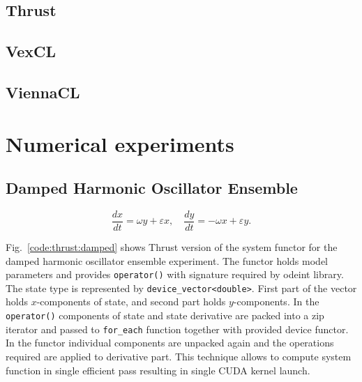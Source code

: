 \documentclass[1p]{elsarticle}
\newcommand{\code}[1]{\lstinline|#1|}
\newcommand{\figref}[1]{Fig.~\ref{#1}}
\begin{document}
\subsection{Thrust}
\subsection{VexCL}
\subsection{ViennaCL}

\section{Numerical experiments}

\subsection{Damped Harmonic Oscillator Ensemble}

\begin{equation} \label{eq:dampedsystem}
    \frac{dx}{dt} = \omega y + \varepsilon x, \quad 
    \frac{dy}{dt} = -\omega x + \varepsilon y.
\end{equation}

\figref{code:thrust:damped} shows Thrust version of the system functor for the
damped harmonic oscillator ensemble experiment. The functor holds model
parameters and provides \code{operator()} with signature required by odeint
library. The state type is represented by \code{device_vector<double>}.  First
part of the vector holds $x$-components of state, and second part holds
$y$-components. In the \code{operator()} components of state and state
derivative are packed into a zip iterator and passed to \code{for_each}
function together with provided device functor. In the functor individual
components are unpacked again and the operations required are applied to
derivative part. This technique allows to compute system function in single
efficient pass resulting in single CUDA kernel launch.
\end{document}
